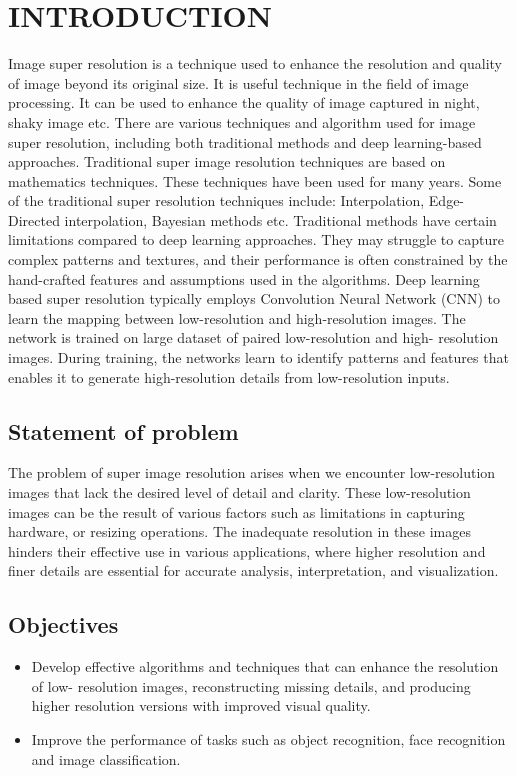 \newpage
{}
\section{INTRODUCTION}
Image super resolution is a technique used to enhance the resolution and quality of
image beyond its original size. It is useful technique in the field of image processing. It
can be used to enhance the quality of image captured in night, shaky image etc. There
are various techniques and algorithm used for image super resolution, including both
traditional methods and deep learning-based approaches. Traditional super image
resolution techniques are based on mathematics techniques. These techniques have
been used for many years. Some of the traditional super resolution techniques include:
Interpolation, Edge-Directed interpolation, Bayesian methods etc. Traditional methods
have certain limitations compared to deep learning approaches. They may struggle to
capture complex patterns and textures, and their performance is often constrained by
the hand-crafted features and assumptions used in the algorithms.
Deep learning based super resolution typically employs Convolution Neural
Network (CNN) to learn the mapping between low-resolution and high-resolution
images. The network is trained on large dataset of paired low-resolution and high-
resolution images. During training, the networks learn to identify patterns and features
that enables it to generate high-resolution details from low-resolution inputs.


\subsection{Statement of problem}
The problem of super image resolution arises when we encounter low-resolution images
that lack the desired level of detail and clarity. These low-resolution images can be the
result of various factors such as limitations in capturing hardware, or resizing
operations. The inadequate resolution in these images hinders their effective use in
various applications, where higher resolution and finer details are essential for accurate
analysis, interpretation, and visualization.

\subsection{Objectives} 
\begin{itemize}
    \item Develop effective algorithms and techniques that can enhance the resolution of low-
    resolution images, reconstructing missing details, and producing higher resolution
    versions with improved visual quality.
    \item Improve the performance of tasks such as object recognition, face recognition and
    image classification.
\end{itemize}

